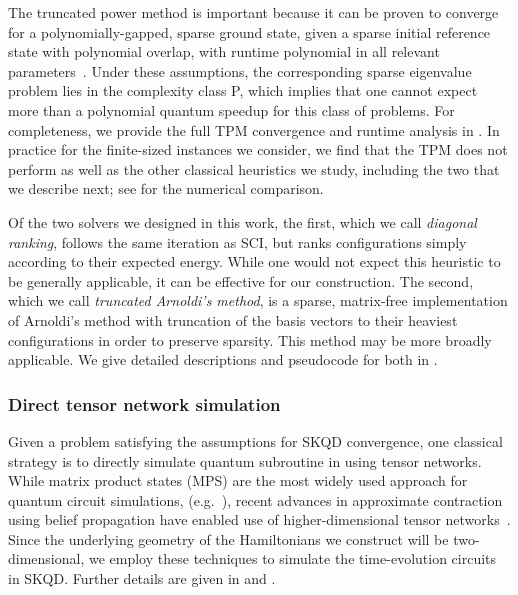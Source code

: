 \documentclass[
  reprint,            %
  amsmath,amssymb,
  aps,
  superscriptaddress, %
  longbibliography
]{revtex4-2}
\theoremstyle{definition}
\begin{document}
The truncated power method is important because it can be proven to converge for a polynomially-gapped, sparse ground state, given a sparse initial reference state with polynomial overlap, with runtime polynomial in all relevant parameters~\cite{yuan2013truncated}.
Under these assumptions, the corresponding sparse eigenvalue problem lies in the complexity class P, which implies that one cannot expect more than a polynomial quantum speedup for this class of problems.
For completeness, we  provide the full TPM convergence and runtime analysis in .
In practice for the finite-sized instances we consider, we find that the TPM does not perform as well as the other classical heuristics we study, including the two that we describe next; see  for the numerical comparison.


Of the two solvers we designed in this work, the first, which we call \emph{diagonal ranking}, follows the same iteration as SCI, but ranks configurations simply according to their expected energy.
While one would not expect this heuristic to be generally applicable, it can be effective for our construction.
The second, which we call \emph{truncated Arnoldi's method}, is a sparse, matrix-free implementation of Arnoldi's method with truncation of the basis vectors to their heaviest configurations in order to preserve sparsity.
This method may be more broadly applicable.
We give detailed descriptions and pseudocode for both in .


\subsubsection{Direct tensor network simulation}
\label{sssec:tensornetwork}

Given a problem satisfying the assumptions for SKQD convergence, one classical strategy is to directly simulate quantum subroutine in  using tensor networks.
While matrix product states (MPS) are the most widely used approach for quantum circuit simulations, (e.g.~\cite{Banuls_SimulationManyqubit_2006,Cirac_MatrixProduct_2021,Zhou_WhatLimits_2020,Napp_EfficientClassical_2022}), recent advances in approximate contraction using belief propagation have enabled use of higher-dimensional tensor networks~\cite{Alkabetz_TensorNetworks_2021,Tindall_GaugingTensor_2023, Wang_TensorNetwork_2024,Tindall_EfficientTensor_2024,Tindall_DynamicsDisordered_2025,rudolphSimulatingSamplingQuantum2025}.
Since the underlying geometry of the Hamiltonians we construct will be two-dimensional, we employ these techniques to simulate the time-evolution circuits in SKQD.
Further details are given in  and .
\end{document}
